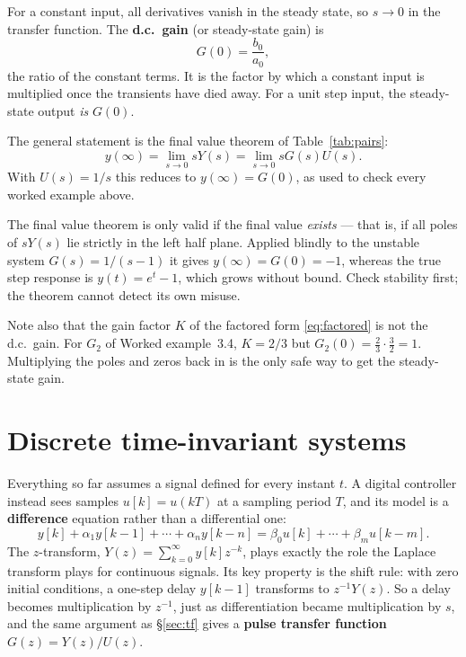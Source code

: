 \documentclass[11pt,a4paper]{article}
\begin{document}
For a constant input, all derivatives vanish in the steady state, so $s\to0$
in the transfer function. The \textbf{d.c.\ gain} (or steady-state gain) is
\begin{equation}
  G(0) = \frac{b_0}{a_0} ,
  \label{eq:dcgain}
\end{equation}
the ratio of the constant terms. It is the factor by which a constant input is
multiplied once the transients have died away. For a unit step input, the
steady-state output \emph{is} $G(0)$.

The general statement is the final value theorem of Table~\ref{tab:pairs}:
\[
  y(\infty) = \lim_{s\to0} sY(s) = \lim_{s\to0} sG(s)U(s) .
\]
With $U(s)=1/s$ this reduces to $y(\infty)=G(0)$, as used to check every worked
example above.

\begin{pitfall}
The final value theorem is only valid if the final value \emph{exists} --- that
is, if all poles of $sY(s)$ lie strictly in the left half plane. Applied blindly
to the unstable system $G(s)=1/(s-1)$ it gives $y(\infty)=G(0)=-1$, whereas the
true step response is $y(t)=e^{t}-1$, which grows without bound. Check
stability first; the theorem cannot detect its own misuse.
\end{pitfall}

Note also that the gain factor $K$ of the factored form \eqref{eq:factored} is
not the d.c.\ gain. For $G_2$ of Worked example~3.4, $K=2/3$ but
$G_2(0)=\tfrac{2}{3}\cdot\tfrac{3}{2}=1$. Multiplying the poles and zeros back
in is the only safe way to get the steady-state gain.

\section{Discrete time-invariant systems}
\label{sec:discrete}

Everything so far assumes a signal defined for every instant $t$. A digital
controller instead sees samples $u[k]=u(kT)$ at a sampling period $T$, and its
model is a \textbf{difference} equation rather than a differential one:
\[
  y[k] + \alpha_1 y[k-1] + \cdots + \alpha_n y[k-n]
  = \beta_0 u[k] + \cdots + \beta_m u[k-m] .
\]
The $z$-transform, $Y(z)=\sum_{k=0}^{\infty}y[k]z^{-k}$, plays exactly the role
the Laplace transform plays for continuous signals. Its key property is the
shift rule: with zero initial conditions, a one-step delay $y[k-1]$ transforms
to $z^{-1}Y(z)$. So a delay becomes multiplication by $z^{-1}$, just as
differentiation became multiplication by $s$, and the same argument as
\S\ref{sec:tf} gives a \textbf{pulse transfer function} $G(z)=Y(z)/U(z)$.
\end{document}
